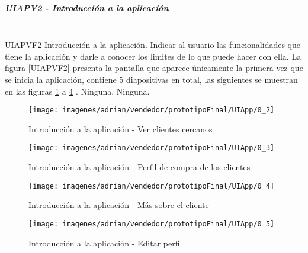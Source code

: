 \subparagraph{UIAPV2 - Introducción a la aplicación} ~\\

{UIAPVF2} %
{Introducción a la aplicación.}  %
{Indicar al usuario las funcionalidades que tiene la aplicación y darle a conocer los limites de lo que puede hacer con ella.} %
{La figura \ref{UIAPVF2} presenta la pantalla que aparece únicamente la primera vez que se inicia la aplicación, contiene 5 diapositivas en total, las siguientes se muestran en las figuras \ref{UIAPVF2-1} a \ref{UIAPVF2-4} .} %
{Ninguna.} %
{Ninguna.} %


\FloatBarrier
\begin{figure}[htbp!]
		\centering
			\texttt{[image: imagenes/adrian/vendedor/prototipoFinal/UIApp/0\_2]}
		\caption{Introducción a la aplicación - Ver clientes cercanos}
		\label{UIAPVF2-1}
\end{figure}
\FloatBarrier

\FloatBarrier
\begin{figure}[htbp!]
		\centering
			\texttt{[image: imagenes/adrian/vendedor/prototipoFinal/UIApp/0\_3]}
		\caption{Introducción a la aplicación - Perfil de compra de los clientes}
		\label{UIAPVF2-2}
\end{figure}
\FloatBarrier

\FloatBarrier
\begin{figure}[htbp!]
		\centering
			\texttt{[image: imagenes/adrian/vendedor/prototipoFinal/UIApp/0\_4]}
		\caption{Introducción a la aplicación - Más sobre el cliente}
		\label{UIAPVF2-3}
\end{figure}
\FloatBarrier

\FloatBarrier
\begin{figure}[htbp!]
		\centering
			\texttt{[image: imagenes/adrian/vendedor/prototipoFinal/UIApp/0\_5]}
		\caption{Introducción a la aplicación - Editar perfil}
		\label{UIAPVF2-4}
\end{figure}
\FloatBarrier


